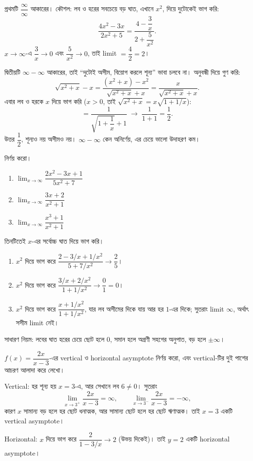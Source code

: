 \documentclass[11pt]{article}
\begin{document}
\begin{solbox}
প্রথমটি $\dfrac{\infty}{\infty}$ আকারের। কৌশল: লব ও হরের সবচেয়ে বড় ঘাত, এখানে
$x^{2}$, দিয়ে দুটোকেই ভাগ করি:
\[
  \frac{4x^{2}-3x}{2x^{2}+5}
  = \frac{4 - \dfrac{3}{x}}{2 + \dfrac{5}{x^{2}}} .
\]
$x \to \infty$-এ $\dfrac{3}{x} \to 0$ এবং $\dfrac{5}{x^{2}} \to 0$, তাই
limit $= \dfrac{4}{2} = 2$।

দ্বিতীয়টি $\infty - \infty$ আকারের, তাই ``দুটোই অসীম, বিয়োগ করলে শূন্য'' ভাবা
চলবে না। অনুবন্ধী দিয়ে গুণ করি:
\[
  \sqrt{x^{2}+x} - x
  = \frac{\left( x^{2}+x \right) - x^{2}}{\sqrt{x^{2}+x} + x}
  = \frac{x}{\sqrt{x^{2}+x} + x} .
\]
এবার লব ও হরকে $x$ দিয়ে ভাগ করি ($x > 0$, তাই
$\sqrt{x^{2}+x} = x\sqrt{1 + 1/x}$):
\[
  = \frac{1}{\sqrt{1 + \dfrac{1}{x}} + 1}
  \;\longrightarrow\; \frac{1}{1+1} = \frac{1}{2} .
\]
উত্তর $\dfrac{1}{2}$, শূন্যও নয় অসীমও নয়। $\infty - \infty$ কেন অনির্ণেয়,
এর চেয়ে ভালো উদাহরণ কম।
\end{solbox}

 নির্ণয় করো।
\begin{enumerate}
  \item $\lim_{x \to \infty} \dfrac{2x^{2}-3x+1}{5x^{2}+7}$
  \item $\lim_{x \to \infty} \dfrac{3x+2}{x^{2}+1}$
  \item $\lim_{x \to \infty} \dfrac{x^{3}+1}{x^{2}+1}$
\end{enumerate}

\begin{sol}
তিনটিতেই $x$-এর সর্বোচ্চ ঘাত দিয়ে ভাগ করি।
\begin{enumerate}
  \item $x^{2}$ দিয়ে ভাগ করে
        $\dfrac{2 - 3/x + 1/x^{2}}{5 + 7/x^{2}} \to \dfrac{2}{5}$।
  \item $x^{2}$ দিয়ে ভাগ করে
        $\dfrac{3/x + 2/x^{2}}{1 + 1/x^{2}} \to \dfrac{0}{1} = 0$।
  \item $x^{2}$ দিয়ে ভাগ করে $\dfrac{x + 1/x^{2}}{1 + 1/x^{2}}$, যার লব
        অসীমের দিকে যায় আর হর $1$-এর দিকে; সুতরাং limit $\infty$, অর্থাৎ
        সসীম limit নেই।
\end{enumerate}
সাধারণ নিয়ম: লবের ঘাত হরের চেয়ে ছোট হলে $0$, সমান হলে অগ্রণী সহগের অনুপাত,
বড় হলে $\pm\infty$।
\end{sol}

 $f(x) = \dfrac{2x}{x-3}$-এর vertical ও horizontal asymptote নির্ণয়
করো, এবং vertical-টির দুই পাশের আচরণ আলাদা করে লেখো।

\begin{sol}
Vertical: হর শূন্য হয় $x = 3$-এ, আর সেখানে লব $6 \neq 0$। সুতরাং
\[
  \lim_{x \to 3^{+}} \frac{2x}{x-3} = \infty, \qquad
  \lim_{x \to 3^{-}} \frac{2x}{x-3} = -\infty ,
\]
কারণ $x$ সামান্য বড় হলে হর ছোট ধনাত্মক, আর সামান্য ছোট হলে হর ছোট ঋণাত্মক।
তাই $x = 3$ একটি vertical asymptote।

Horizontal: $x$ দিয়ে ভাগ করে $\dfrac{2}{1 - 3/x} \to 2$ (উভয় দিকেই)। তাই
$y = 2$ একটি horizontal asymptote।
\end{sol}
\end{document}

